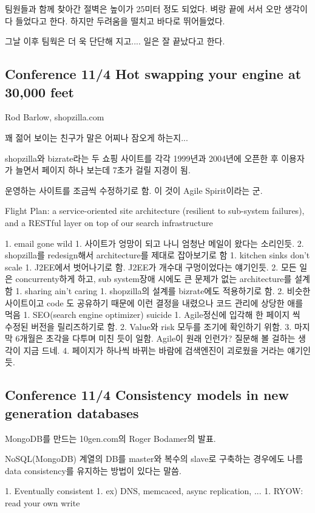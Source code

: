 \documentclass[a4paper]{article}
\begin{document}
팀원들과 함께 찾아간 절벽은 높이가 25미터 정도 되었다. 벼랑 끝에 서서
오만 생각이 다 들었다고 한다. 하지만 두려움을 떨치고 바다로
뛰어들었다.
 
그날 이후 팀웍은 더 욱 단단해 지고.... 일은 잘 끝났다고 한다.
 
\subsection{Conference 11/4 Hot swapping your engine at 30,000 feet}
 
Rod Barlow, shopzilla.com
 
꽤 젊어 보이는 친구가 말은 어찌나 잠오게 하는지...
 
shopzilla와 bizrate라는 두 쇼핑 사이트를 각각 1999년과 2004년에 오픈한
후 이용자가 늘면서 페이지 하나 보는데 7초가 걸릴 지경이 됨.
 
운영하는 사이트를 조금씩 수정하기로 함. 이 것이 Agile Spirit이라는 군.
 
Flight Plan: a service-oriented site architecture (resilient to
sub-system failures), and a RESTful layer on top of our search
infrastructure
 
1. email gone wild
1. 사이트가 엉망이 되고 나니 엄청난 메일이 왔다는 소리인듯. 
2. shopzilla를 redesign해서 architecture를 제대로 잡아보기로 함
1. kitchen sinks don’t scale
1. J2EE에서 벗어나기로 함. J2EE가 개수대 구멍이었다는 얘기인듯.
2. 모든 일은 concurrenty하게 하고, sub system장애 시에도 큰 문제가 없는 architecture를 설계함
1. sharing ain’t caring
1. shopzilla의 설계를 bizrate에도 적용하기로 함.
2. 비슷한 사이트이고 code 도 공유하기 때문에 이런 결정을 내렸으나 코드 관리에 상당한 애를 먹음
1. SEO(search engine optimizer) suicide
1. Agile정신에 입각해 한 페이지 씩 수정된 버전을 릴리즈하기로 함.
2. Value와 risk 모두를 조기에 확인하기 위함.
3. 마지막 6개월은 초각을 다투며 미친 듯이 일함. Agile이 원래 인런가? 질문해 볼 걸하는 생각이 지금 드네.
4. 페이지가 하나씩 바뀌는 바람에  검색엔진이 괴로웠을 거라는 얘기인듯.
 
\subsection{Conference 11/4 Consistency models in new generation databases}
 
MongoDB를 만드는 10gen.com의 Roger Bodamer의 발표.
 
NoSQL(MongoDB) 계열의 DB를 master와 복수의 slave로 구축하는 경우에도
나름 data consistency를 유지하는 방법이 있다는 말씀.
 
1. Eventually consistent
1. ex) DNS, memcaced, async replication, ...
1. RYOW: read your own write
 
\end{document}
